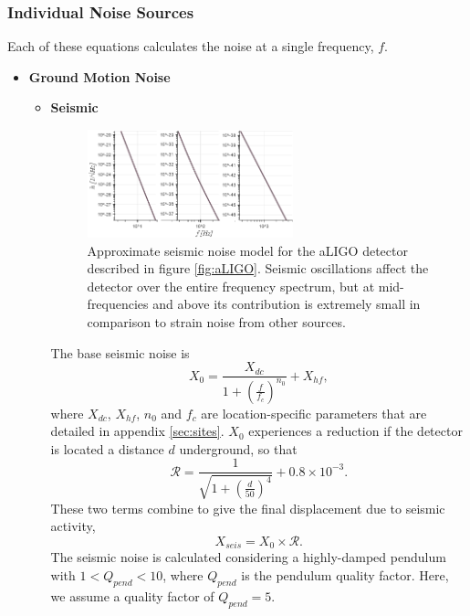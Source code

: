 \documentclass{article}
\begin{document}
\subsubsection{Individual Noise Sources}
Each of these equations calculates the noise at a single frequency, $f$.
\begin{itemize}
	\item \textbf{Ground Motion Noise} \\
    \begin{itemize}
    \item \textbf{Seismic} \\
       \begin{figure}[h!]
    \centering
    \includegraphics[width=0.6\textwidth]{SPQ_aLIGO_seismic.png}
    \caption{Approximate seismic noise model for the aLIGO detector
      described in figure \ref{fig:aLIGO}. Seismic oscillations affect
      the detector over the entire frequency spectrum, but at
      mid-frequencies and above its contribution is extremely small in
      comparison to strain noise from other sources.}
    \label{fig:seismic}
    \end{figure}
   The base seismic noise is
    \begin{equation}
    \label{eqn::baseseismic}
    X_0 = \frac{X_{dc}}{1 + \left(\frac{f}{f_c}\right)^{n_0}} + X_{hf},
    \end{equation}
    where $X_{dc}$, $X_{hf}$, $n_0$ and $f_c$ are location-specific
    parameters that are detailed in appendix \ref{sec:sites}. $X_0$
    experiences a reduction if the detector is located a distance $d$
    underground, so that
    \[
    \mathcal{R} = \frac{1}{\sqrt{1 + \left(\frac{d}{50}\right)^4}} + 0.8\times10^{-3} .
    \]
    These two terms combine to give the final displacement due to seismic activity,
    \begin{equation}
        X_{seis} = X_0 \times \mathcal{R}.
    \label{eq:Xseis}
    \end{equation}
    The seismic noise is calculated considering a highly-damped
    pendulum with $1 < Q_{pend} < 10$, where $Q_{pend}$ is the
    pendulum quality factor. Here, we assume a quality factor of
    $Q_{pend} = 5$. 
    

\end{itemize}
\end{itemize}
\end{document}

